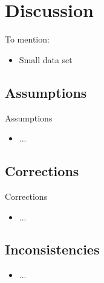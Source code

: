 \section{Discussion}
To mention:
\begin{itemize}
	\item Small data set
\end{itemize}

\subsection{Assumptions}
Assumptions
\begin{itemize}
	\item ...
\end{itemize}

\subsection{Corrections}
Corrections
\begin{itemize}
	\item ...
\end{itemize}

\subsection{Inconsistencies}
\begin{itemize}
	\item ...
\end{itemize}